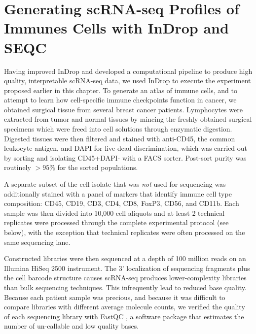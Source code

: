
\section{Generating scRNA-seq Profiles of Immunes Cells with InDrop and SEQC} %

Having improved InDrop and developed a computational pipeline to produce high quality, interpretable scRNA-seq data, we used InDrop to execute the experiment proposed earlier in this chapter. 
To generate an atlas of immune cells, and to attempt to learn how cell-specific immune checkpoints function in cancer, we obtained surgical tissue from several breast cancer patients. 
Lymphocytes were extracted from tumor and normal tissues by mincing the freshly obtained surgical specimens which were freed into cell solutions through enzymatic digestion. 
Digested tissues were then filtered and stained with anti-CD45, the common leukocyte antigen, and DAPI for live-dead discrimination, which was carried out by sorting and isolating CD45+DAPI- with a FACS sorter.  
Post-sort purity was routinely $>95\%$ for the sorted populations.

A separate subset of the cell isolate that was \textit{not} used for sequencing was additionally stained with a panel of markers that identify immune cell type composition: CD45, CD19, CD3, CD4, CD8, FoxP3, CD56, and CD11b. 
Each sample was then divided into 10,000 cell aliquots and at least 2 technical replicates were processed through the complete experimental protocol (see below), with the exception that technical replicates were often processed on the same sequencing lane. 

Constructed libraries were then sequenced at a depth of 100 million reads on an Illumina HiSeq 2500 instrument.
The 3' localization of sequencing fragments plus the cell barcode structure causes scRNA-seq produces lower-complexity libraries than bulk sequencing techniques. 
This infrequently lead to reduced base quality. 
Because each patient sample was precious, and because it was difficult to compare libraries with different average molecule counts, we verified the quality of each sequencing library with FastQC \citep{Andrews2010}, a software package that estimates the number of un-callable and low quality bases.

